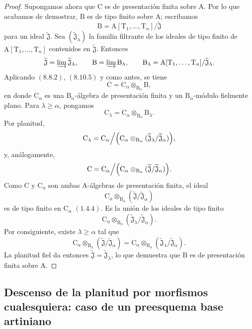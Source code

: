 \begin{proof}
Supongamos ahora que $\mathrm{C}$ es de presentación finita sobre $\mathrm{A}$. Por lo que acabamos de demostrar, $\mathrm{B}$ es de tipo finito sobre $\mathrm{A}$; escribamos
\[
  \mathrm{B}
  =\mathrm{A}[\mathrm{T}_1,\ldots,\mathrm{T}_n]/\widetilde{\mathfrak{J}}
\]
para un ideal $\widetilde{\mathfrak{J}}$. Sea $(\widetilde{\mathfrak{J}}_\lambda)$ la familia filtrante de los ideales de tipo finito de $\mathrm{A}[\mathrm{T}_1,\ldots,\mathrm{T}_n]$ contenidos en $\widetilde{\mathfrak{J}}$. Entonces
\[
  \widetilde{\mathfrak{J}}
  =\varinjlim\widetilde{\mathfrak{J}}_\lambda,
  \qquad
  \mathrm{B}
  =\varinjlim\mathrm{B}_\lambda,
  \qquad
  \mathrm{B}_\lambda
  =\mathrm{A}[\mathrm{T}_1,\ldots,\mathrm{T}_n]/
   \widetilde{\mathfrak{J}}_\lambda.
\]
Aplicando $(8.8.2)$, $(8.10.5)$ y  como antes, se tiene
\[
  \mathrm{C}
  =\mathrm{C}_\alpha\otimes_{\mathrm{B}_\alpha}\mathrm{B},
\]
en donde $\mathrm{C}_\alpha$ es una $\mathrm{B}_\alpha$-álgebra de presentación finita y un $\mathrm{B}_\alpha$-módulo fielmente plano. Para $\lambda\geqslant\alpha$, pongamos
\[
  \mathrm{C}_\lambda
  =\mathrm{C}_\alpha\otimes_{\mathrm{B}_\alpha}\mathrm{B}_\lambda.
\]
Por planitud,
\[
  \mathrm{C}_\lambda
  =
  \mathrm{C}_\alpha\Big/
  \Bigl(
    \mathrm{C}_\alpha\otimes_{\mathrm{B}_\alpha}
    (\widetilde{\mathfrak{J}}_\lambda/
     \widetilde{\mathfrak{J}}_\alpha)
  \Bigr),
\]
y, análogamente,
\[
  \mathrm{C}
  =
  \mathrm{C}_\alpha\Big/
  \Bigl(
    \mathrm{C}_\alpha\otimes_{\mathrm{B}_\alpha}
    (\widetilde{\mathfrak{J}}/
     \widetilde{\mathfrak{J}}_\alpha)
  \Bigr).
\]
Como $\mathrm{C}$ y $\mathrm{C}_\alpha$ son ambas $\mathrm{A}$-álgebras de presentación finita, el ideal
\[
  \mathrm{C}_\alpha\otimes_{\mathrm{B}_\alpha}
  (\widetilde{\mathfrak{J}}/
   \widetilde{\mathfrak{J}}_\alpha)
\]
es de tipo finito en $\mathrm{C}_\alpha$ $(1.4.4)$. Es la unión de los ideales de tipo finito
\[
  \mathrm{C}_\alpha\otimes_{\mathrm{B}_\alpha}
  (\widetilde{\mathfrak{J}}_\lambda/
   \widetilde{\mathfrak{J}}_\alpha).
\]
Por consiguiente, existe $\lambda\geqslant\alpha$ tal que
\[
  \mathrm{C}_\alpha\otimes_{\mathrm{B}_\alpha}
  (\widetilde{\mathfrak{J}}/
   \widetilde{\mathfrak{J}}_\alpha)
  =
  \mathrm{C}_\alpha\otimes_{\mathrm{B}_\alpha}
  (\widetilde{\mathfrak{J}}_\lambda/
   \widetilde{\mathfrak{J}}_\alpha).
\]
La planitud fiel da entonces
$\widetilde{\mathfrak{J}}=\widetilde{\mathfrak{J}}_\lambda$, lo que demuestra que $\mathrm{B}$ es de presentación finita sobre $\mathrm{A}$.
\end{proof}

\subsection{Descenso de la planitud por morfismos cualesquiera: caso de un preesquema base artiniano}
\label{subsection:IV.11.4}

